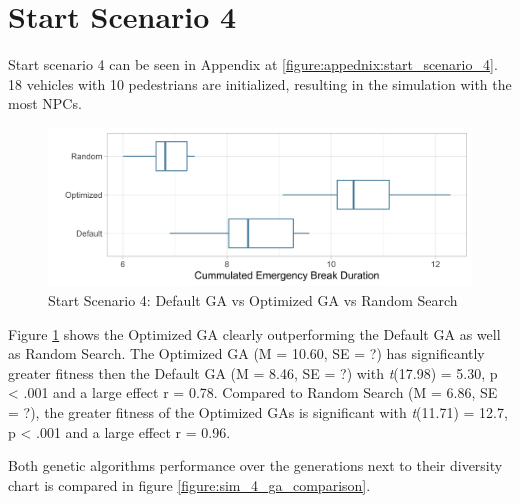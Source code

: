 \section{Start Scenario 4}
Start scenario 4 can be seen in Appendix at \ref{figure:appednix:start_scenario_4}. 18 vehicles with 10 pedestrians are initialized, resulting in the simulation with the most NPCs.

\begin{figure}[ht] 
	\label{figure:sim_4_comparison}
	\includegraphics[width=1\linewidth]{simulations/evaluation/plots/sim_4_comparison}
	\caption{Start Scenario 4: Default GA vs Optimized GA vs Random Search}
\end{figure}

Figure \ref{figure:sim_4_comparison} shows the Optimized GA clearly outperforming the Default GA as well as Random Search.
The Optimized GA (M = 10.60, SE = ?) has significantly greater fitness then the Default GA (M = 8.46, SE = ?) with \textit{t}(17.98) = 5.30, p < .001 and a large effect r = 0.78.
Compared to Random Search (M = 6.86, SE = ?), the greater fitness of the Optimized GAs is significant with \textit{t}(11.71) = 12.7, p < .001 and a large effect r = 0.96.

Both genetic algorithms performance over the generations next to their diversity chart is compared in figure \ref{figure:sim_4_ga_comparison}.

